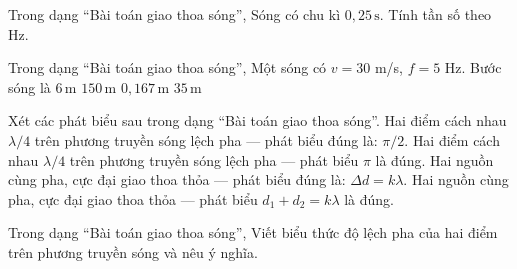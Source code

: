 \begin{ex}
Trong dạng “Bài toán giao thoa sóng”, Sóng có chu kì $0,25\,\text{s}$. Tính tần số theo Hz.
\end{ex}

\begin{ex}
Trong dạng “Bài toán giao thoa sóng”, Một sóng có $v=30$ m/s, $f=5$ Hz. Bước sóng là
\choice
{\True $6\,\text{m}$}
{$150\,\text{m}$}
{$0,167\,\text{m}$}
{$35\,\text{m}$}
\end{ex}

\begin{ex}
Xét các phát biểu sau trong dạng “Bài toán giao thoa sóng”.
\choiceTF
{\True Hai điểm cách nhau $\lambda/4$ trên phương truyền sóng lệch pha — phát biểu đúng là: $\pi/2$.}
{Hai điểm cách nhau $\lambda/4$ trên phương truyền sóng lệch pha — phát biểu $\pi$ là đúng.}
{\True Hai nguồn cùng pha, cực đại giao thoa thỏa — phát biểu đúng là: $\Delta d=k\lambda$.}
{Hai nguồn cùng pha, cực đại giao thoa thỏa — phát biểu $d_1+d_2=k\lambda$ là đúng.}
\end{ex}

\begin{ex}
Trong dạng “Bài toán giao thoa sóng”, Viết biểu thức độ lệch pha của hai điểm trên phương truyền sóng và nêu ý nghĩa.
\choiceTF

\end{ex}

